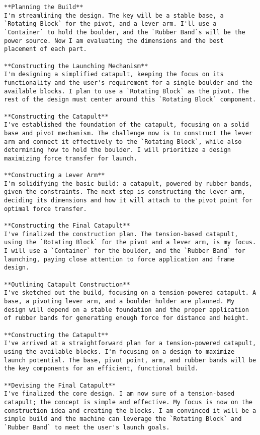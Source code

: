 \begin{lstlisting}
**Planning the Build**
I'm streamlining the design. The key will be a stable base, a `Rotating Block` for the pivot, and a lever arm. I'll use a `Container` to hold the boulder, and the `Rubber Band`s will be the power source. Now I am evaluating the dimensions and the best placement of each part.

**Constructing the Launching Mechanism**
I'm designing a simplified catapult, keeping the focus on its functionality and the user's requirement for a single boulder and the available blocks. I plan to use a `Rotating Block` as the pivot. The rest of the design must center around this `Rotating Block` component.

**Constructing the Catapult**
I've established the foundation of the catapult, focusing on a solid base and pivot mechanism. The challenge now is to construct the lever arm and connect it effectively to the `Rotating Block`, while also determining how to hold the boulder. I will prioritize a design maximizing force transfer for launch.

**Constructing a Lever Arm**
I'm solidifying the basic build: a catapult, powered by rubber bands, given the constraints. The next step is constructing the lever arm, deciding its dimensions and how it will attach to the pivot point for optimal force transfer.

**Constructing the Final Catapult**
I've finalized the construction plan. The tension-based catapult, using the `Rotating Block` for the pivot and a lever arm, is my focus. I will use a `Container` for the boulder, and the `Rubber Band` for launching, paying close attention to force application and frame design.

**Outlining Catapult Construction**
I've sketched out the build, focusing on a tension-powered catapult. A base, a pivoting lever arm, and a boulder holder are planned. My design will depend on a stable foundation and the proper application of rubber bands for generating enough force for distance and height.

**Constructing the Catapult**
I've arrived at a straightforward plan for a tension-powered catapult, using the available blocks. I'm focusing on a design to maximize launch potential. The base, pivot point, arm, and rubber bands will be the key components for an efficient, functional build.

**Devising the Final Catapult**
I've finalized the core design. I am now sure of a tension-based catapult; the concept is simple and effective. My focus is now on the construction idea and creating the blocks. I am convinced it will be a simple build and the machine can leverage the `Rotating Block` and `Rubber Band` to meet the user's launch goals.


\end{lstlisting}
